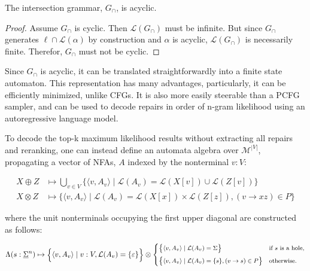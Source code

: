 \documentclass[sigplan,review,acmsmall,nonacm,anonymous]{acmart}\settopmatter{printfolios=false,printccs=false,printacmref=false}
\begin{document}
  \begin{lemma}\label{lemma:upper-bound}
    The intersection grammar, $G_\cap$, is acyclic.
  \end{lemma}

  \begin{proof}
    Assume $G_\cap$ is cyclic. Then $\mathcal{L}(G_\cap)$ must be infinite. But since $G_\cap$ generates $\ell \cap \mathcal{L}(\alpha)$ by construction and $\alpha$ is acyclic, $\mathcal{L}(G_\cap)$ is necessarily finite. Therefor, $G_\cap$ must not be cyclic.
  \end{proof}

  Since $G_\cap$ is acyclic, it can be translated straightforwardly into a finite state automaton. This representation has many advantages, particularly, it can be efficiently minimized, unlike CFGs. It is also more easily steerable than a PCFG sampler, and can be used to decode repairs in order of n-gram likelihood using an autoregressive language model.

  To decode the top-k maximum likelihood results without extracting all repairs and reranking, one can instead define an automata algebra over $\mathcal{M}^{|V|}$, propagating a vector of NFAs, $A$ indexed by the nonterminal $v: V$:

  \begin{align}
    X \oplus Z &\mapsto \bigcup_{v \in V}\big\{\langle v, A_v \rangle \mid \mathcal{L}(A_v) = \mathcal{L}(X[v]) \cup \mathcal{L}(Z[v])\big\}\\
    X \otimes Z &\mapsto \big\{\langle v, A_v \rangle \mid \mathcal{L}(A_v) = \mathcal{L}(X[x]) \times \mathcal{L}(Z[z]), (v \rightarrow xz) \in P\big\}
  \end{align}

  \noindent where the unit nonterminals occupying the first upper diagonal are constructed as follows:

  \begin{equation}
    \begin{footnotesize}
      \Lambda(s: \underline\Sigma^n) \mapsto \Big\{\langle v, A_v\rangle\mid v: V, \mathcal{L}(A_v) = \{\varepsilon\}\Big\} \otimes \begin{cases}
        \big\{\langle v, A_v \rangle \mid \mathcal{L}(A_v) = \Sigma \big\} & \text{if $s$ is a hole,} \vspace{5pt}\\
        \big\{\langle v, A_v \rangle \mid \mathcal{L}(A_v) = \{s\}, (v \rightarrow s)\in P\big\} & \text{otherwise.}
      \end{cases}
    \end{footnotesize}
  \end{equation}
\end{document}
